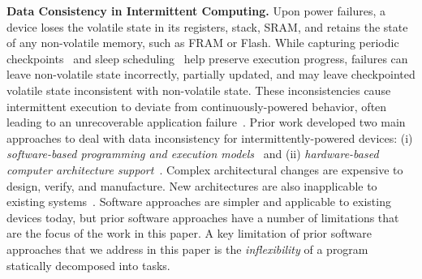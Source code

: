 \textbf{Data Consistency in Intermittent Computing.}
Upon power failures, a device loses the volatile
state in its registers, stack, SRAM, and retains the state of any non-volatile
memory, such as FRAM or Flash. While capturing periodic
checkpoints~\cite{mementos,quickrecall} and sleep
scheduling~\cite{dewdrop,hibernus,hibernusplusplus} help preserve execution
progress, failures can leave non-volatile state incorrectly, partially updated,
and may leave checkpointed volatile state inconsistent with non-volatile state.
These inconsistencies cause intermittent execution to deviate from
continuously-powered behavior, often leading to an unrecoverable
application failure~\cite{dino,edb}. Prior work developed two main approaches to deal with data inconsistency for
intermittently-powered devices: (i) \emph{software-based programming and
execution models}~\cite{dino,ratchet,chain,alpaca} and (ii)
\emph{hardware-based computer architecture
support}~\cite{hicks_isca_2017,idetic,nvp}. Complex architectural changes are
expensive to design, verify, and manufacture. New architectures are also
inapplicable to existing systems~\cite{hicks_isca_2017,nvp}. Software
approaches are simpler and applicable to existing devices today, but prior
software approaches have a number of limitations that are the focus of the work
in this paper. A key limitation of prior software approaches that we address in this paper is the {\em inflexibility} of a program statically decomposed into tasks.


